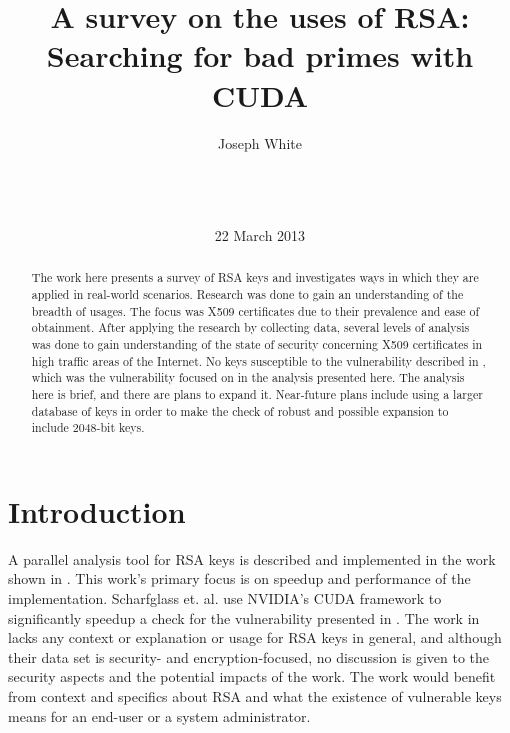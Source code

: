 \documentclass{acm_proc_article-sp}
\begin{document}
\title{A survey on the uses of RSA: Searching for bad primes with CUDA}

\author{
\alignauthor
Joseph White\\
       \\
       \\
       \\
}
\date{22 March 2013}

\maketitle
\begin{abstract}
The work here presents a survey of RSA keys and investigates ways in which they
are applied in real-world scenarios. Research was done to gain an understanding
of the breadth of usages. The focus was X509 certificates due to their
prevalence and ease of obtainment. After applying the research by collecting
data, several levels of analysis was done to gain understanding of the state
of security concerning X509 certificates in high traffic areas of the Internet.
No keys susceptible to the vulnerability described in \cite{lenstra2012ron},
which was the vulnerability focused on in the analysis presented here. The
analysis here is brief, and there are plans to expand it. Near-future plans
include using a larger database of keys in order to make the check of robust
and possible expansion to include 2048-bit keys.
\end{abstract}




\section{Introduction}
A parallel analysis tool for RSA keys is described and implemented in
the work shown in \cite{scharfglass2012breaking}. This work's primary focus is
on speedup and performance of the implementation. Scharfglass et. al. use
NVIDIA's CUDA framework to significantly speedup a check for the vulnerability
presented in \cite{lenstra2012ron}. The work in \cite{scharfglass2012breaking}
lacks any context or explanation or usage for RSA keys in general, and although
their data set is security- and encryption-focused, no discussion is given to
the security aspects and the potential impacts of the work. The work would
benefit from context and specifics about RSA and what the existence of
vulnerable keys means for an end-user or a system administrator.
\end{document}
